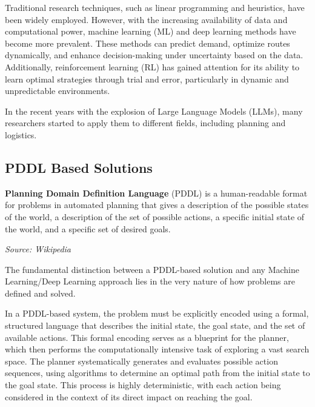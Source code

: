 Traditional research techniques, such as linear programming and heuristics, have
been widely employed. However, with the increasing availability of data and computational
power, machine learning (ML) and deep learning methods have become more
prevalent. These methods can predict demand, optimize routes dynamically, and enhance
decision-making under uncertainty based on the data. Additionally, reinforcement
learning (RL) has gained attention for its ability to learn optimal strategies through
trial and error, particularly in dynamic and unpredictable environments.

In the recent years with the explosion of Large Language Models (LLMs), many researchers
started to apply them to different fields, including planning and logistics.


\subsection{PDDL Based Solutions}
\begin{blockquote}
  \textbf{Planning Domain Definition Language} (PDDL) is a human-readable format
  for problems in automated planning that gives a description of the possible
  states of the world, a description of the set of possible actions, a specific
  initial state of the world, and a specific set of desired goals.

  \emph{Source: Wikipedia\footnotemark}
\end{blockquote}

The fundamental distinction between a PDDL-based solution and any Machine
Learning/Deep Learning approach lies in the very nature of how problems are
defined and solved.

In a PDDL-based system, the problem must be explicitly encoded using a formal,
structured language that describes the initial state, the goal state, and the
set of available actions. This formal encoding serves as a blueprint for the planner,
which then performs the computationally intensive task of exploring a vast
search space. The planner systematically generates and evaluates possible action
sequences, using algorithms to determine an optimal path from the initial state
to the goal state. This process is highly deterministic, with each action being
considered in the context of its direct impact on reaching the goal.

